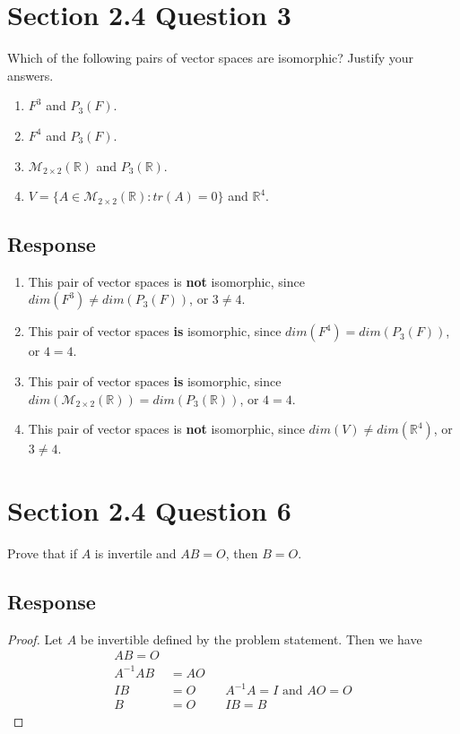 \documentclass[13pt]{article}
\begin{document}
\newpage
\section*{Section 2.4 Question 3}
Which of the following pairs of vector spaces are isomorphic? Justify your answers.
\begin{enumerate}[label=(\alph*),leftmargin=*]
\item $F^3$ and $P_3(F)$.
\item $F^4$ and $P_3(F)$.
\item $\mathcal{M}_{2 \times 2}(\mathbb{R})$ and $P_3(\mathbb{R})$.
\item $V = \{ A \in \mathcal{M}_{2 \times 2}(\mathbb{R}) : tr(A) = 0 \}$ and $\mathbb{R}^4$.
\end{enumerate}
\subsection*{Response}
\begin{enumerate}[label=(\alph*),leftmargin=*]
\item This pair of vector spaces is \textbf{not} isomorphic, since $dim(F^3) \neq dim(P_3(F))$, or $3 \neq 4$.
\item This pair of vector spaces \textbf{is} isomorphic, since $dim(F^4) = dim(P_3(F))$, or $4 = 4$.
\item This pair of vector spaces \textbf{is} isomorphic, since $dim(\mathcal{M}_{2 \times 2}(\mathbb{R})) = dim(P_3(\mathbb{R}))$, or $4 = 4$.
\item This pair of vector spaces is \textbf{not} isomorphic, since $dim(V) \neq dim(\mathbb{R}^4)$, or $3 \neq 4$.
\end{enumerate}

\newpage
\section*{Section 2.4 Question 6}
Prove that if $A$ is invertile and $AB = O$, then $B = O$.
\subsection*{Response}
\begin{proof}
  Let $A$ be invertible defined by the problem statement. Then we have
  \begin{align*}
    AB = O \\
    A^{-1}AB &= AO \\
    IB &= O && A^{-1}A = I \text{ and } AO = O \\
    B &= O && IB = B
  \end{align*}
\end{proof}
\end{document}
